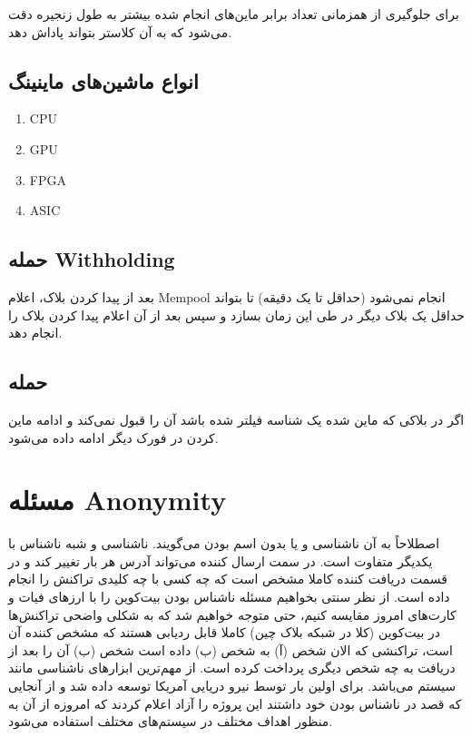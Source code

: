 \documentclass[10pt, a4paper]{article}
\begin{document}
برای جلوگیری از همزمانی تعداد برابر ماین‌های انجام شده بیشتر به طول زنجیره دقت
می‌شود که به آن کلاستر بتواند پاداش دهد.


\subsection*{انواع ماشین‌های ماینینگ}

\begin{enumerate}
    \item CPU
    \item GPU
    \item FPGA
    \item ASIC
\end{enumerate}

\subsection{حمله Withholding}

بعد از پیدا کردن بلاک، اعلام Mempool انجام نمی‌شود (حداقل تا یک دقیقه) تا بتواند
حداقل یک بلاک دیگر در طی این زمان بسازد و سپس بعد از آن اعلام پیدا کردن بلاک را
انجام دهد.

\subsection{حمله }

اگر در بلاکی که ماین شده یک شناسه فیلتر شده باشد آن را قبول نمی‌کند و ادامه ماین
کردن در فورک دیگر ادامه داده می‌شود.

\section{مسئله Anonymity}

اصطلاحاً به آن ناشناسی و یا بدون اسم بودن می‌گویند. ناشناسی و شبه ناشناس با
یکدیگر متفاوت است. در سمت ارسال کننده می‌تواند آدرس  هر بار تغییر
کند و در قسمت دریافت کننده کاملا مشخص است که چه کسی با چه کلیدی تراکنش را انجام
داده است. از نظر سنتی بخواهیم مسئله ناشناس بودن بیت‌کوین را با ارز‌های فیات و
کارت‌های امروز مقایسه کنیم، حتی متوجه خواهیم شد که به شکلی واضحی تراکنش‌ها در
بیت‌کوین (کلا در شبکه بلاک چین) کاملا قابل ردیابی هستند که مشخص کننده آن است،
تراکنشی که الان شخص (آ) به شخص (ب) داده است شخص (ب) آن را بعد از دریافت به چه
شخص دیگری پرداخت کرده است. از مهم‌ترین ابزار‌های ناشناسی مانند سیستم 
می‌باشد.  برای اولین بار توسط نیرو دریایی آمریکا توسعه داده شد و از
آنجایی که قصد در ناشناس بودن خود داشتند این پروژه را آزاد اعلام کردند که امروزه
از آن به منظور اهداف مختلف در سیستم‌های مختلف استفاده می‌شود.
\end{document}
